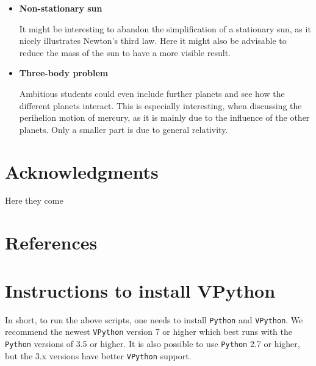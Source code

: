 \documentclass[12pt,ngerman,american]{iopart}
\newcommand{\python}[0]{\texttt{Python}}
\newcommand{\vpython}[0]{\texttt{VPython}}
\begin{document}
\begin{itemize}
\begin{itemize}
\item \textbf{Non-stationary sun}

It might be interesting to abandon the simplification of a stationary sun, as it nicely illustrates Newton's third law.
Here it might also be advisable to reduce the mass of the sun to have a more visible result.

\item \textbf{Three-body problem}

Ambitious students could even include further planets and see how the different planets interact.
This is especially interesting, when discussing the perihelion motion of mercury, as it is mainly due to the influence of the other planets.
Only a smaller part is due to general relativity.

\end{itemize}

\end{itemize}

\appendix

\section*{Acknowledgments}
Here they come

\section*{References}


\section{Instructions to install VPython}\label{appendix:python}
In short, to run the above scripts, one needs to install \python{} and \vpython{}.
We recommend the newest \vpython{} version 7 or higher which best runs with the \python{} versions of 3.5 or higher.
It is also possible to use \python{} 2.7 or higher, but the 3.x versions have better \vpython{} support.
\end{document}
